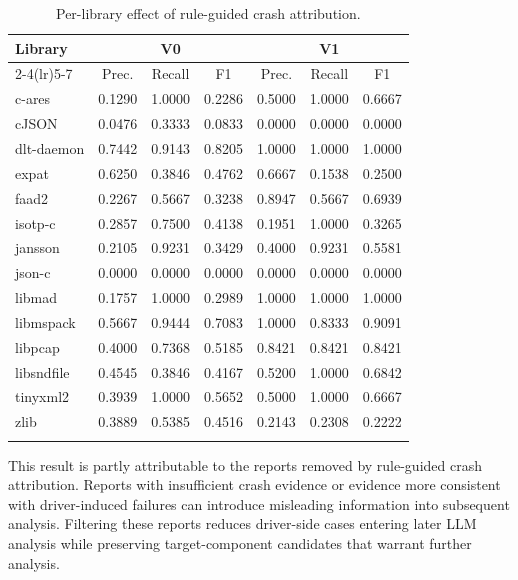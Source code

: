 \documentclass[pdflatex,sn-basic]{sn-jnl}%
\renewcommand{\arraystretch}{1.16}%
\theoremstyle{thmstyleone}%
\theoremstyle{thmstyletwo}%
\theoremstyle{thmstylethree}%
\begin{document}
\begin{table}[!htbp]
\caption{Per-library effect of rule-guided crash attribution.}
\label{tab:per-library-rule-attribution}
\centering
\small
\setlength{\tabcolsep}{3pt}
\renewcommand{\arraystretch}{1.12}
\begin{tabular*}{\linewidth}{@{\extracolsep{\fill}}lcccccc}
\toprule
Library & \multicolumn{3}{c}{V0} & \multicolumn{3}{c}{V1} \\
\cmidrule(lr){2-4}\cmidrule(lr){5-7}
& Prec. & Recall & F1 & Prec. & Recall & F1 \\
\midrule
c-ares & 0.1290 & 1.0000 & 0.2286 & 0.5000 & 1.0000 & 0.6667 \\
cJSON & 0.0476 & 0.3333 & 0.0833 & 0.0000 & 0.0000 & 0.0000 \\
dlt-daemon & 0.7442 & 0.9143 & 0.8205 & 1.0000 & 1.0000 & 1.0000 \\
expat & 0.6250 & 0.3846 & 0.4762 & 0.6667 & 0.1538 & 0.2500 \\
faad2 & 0.2267 & 0.5667 & 0.3238 & 0.8947 & 0.5667 & 0.6939 \\
isotp-c & 0.2857 & 0.7500 & 0.4138 & 0.1951 & 1.0000 & 0.3265 \\
jansson & 0.2105 & 0.9231 & 0.3429 & 0.4000 & 0.9231 & 0.5581 \\
json-c & 0.0000 & 0.0000 & 0.0000 & 0.0000 & 0.0000 & 0.0000 \\
libmad & 0.1757 & 1.0000 & 0.2989 & 1.0000 & 1.0000 & 1.0000 \\
libmspack & 0.5667 & 0.9444 & 0.7083 & 1.0000 & 0.8333 & 0.9091 \\
libpcap & 0.4000 & 0.7368 & 0.5185 & 0.8421 & 0.8421 & 0.8421 \\
libsndfile & 0.4545 & 0.3846 & 0.4167 & 0.5200 & 1.0000 & 0.6842 \\
tinyxml2 & 0.3939 & 1.0000 & 0.5652 & 0.5000 & 1.0000 & 0.6667 \\
zlib & 0.3889 & 0.5385 & 0.4516 & 0.2143 & 0.2308 & 0.2222 \\
\botrule
\end{tabular*}
\end{table}

This result is partly attributable to the reports removed by rule-guided crash attribution. Reports with insufficient crash evidence or evidence more consistent with driver-induced failures can introduce misleading information into subsequent analysis. Filtering these reports reduces driver-side cases entering later LLM analysis while preserving target-component candidates that warrant further analysis.
\end{document}

